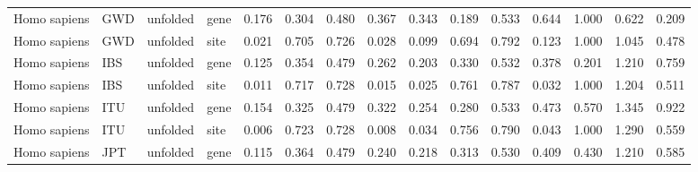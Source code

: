 \begin{longtable}{llllrrrrrrrrrrr}
        Homo sapiens &                       GWD &  unfolded &  gene &                              0.176 &                               0.304 &                 0.480 &                 0.367 &                              0.343 &                               0.189 &                 0.533 &                 0.644 &        1.000 &  0.622 &  0.209 \\
        Homo sapiens &                       GWD &  unfolded &  site &                              0.021 &                               0.705 &                 0.726 &                 0.028 &                              0.099 &                               0.694 &                 0.792 &                 0.123 &        1.000 &  1.045 &  0.478 \\
        Homo sapiens &                       IBS &  unfolded &  gene &                              0.125 &                               0.354 &                 0.479 &                 0.262 &                              0.203 &                               0.330 &                 0.532 &                 0.378 &        0.201 &  1.210 &  0.759 \\
        Homo sapiens &                       IBS &  unfolded &  site &                              0.011 &                               0.717 &                 0.728 &                 0.015 &                              0.025 &                               0.761 &                 0.787 &                 0.032 &        1.000 &  1.204 &  0.511 \\
        Homo sapiens &                       ITU &  unfolded &  gene &                              0.154 &                               0.325 &                 0.479 &                 0.322 &                              0.254 &                               0.280 &                 0.533 &                 0.473 &        0.570 &  1.345 &  0.922 \\
        Homo sapiens &                       ITU &  unfolded &  site &                              0.006 &                               0.723 &                 0.728 &                 0.008 &                              0.034 &                               0.756 &                 0.790 &                 0.043 &        1.000 &  1.290 &  0.559 \\
        Homo sapiens &                       JPT &  unfolded &  gene &                              0.115 &                               0.364 &                 0.479 &                 0.240 &                              0.218 &                               0.313 &                 0.530 &                 0.409 &        0.430 &  1.210 &  0.585 \\

\end{longtable}

